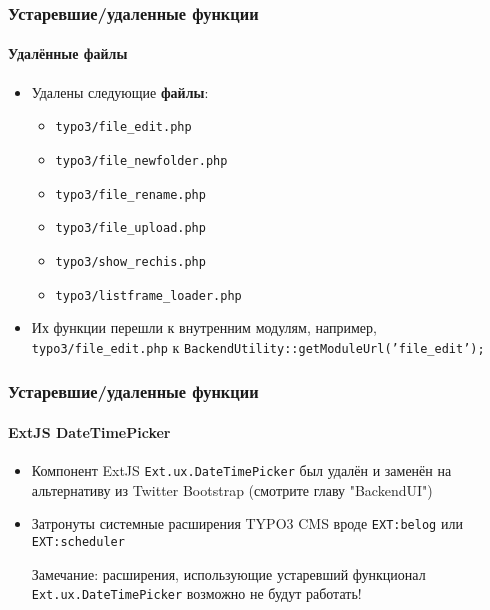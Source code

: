 \begin{frame}[fragile]
	\frametitle{Устаревшие/удаленные функции}
	\framesubtitle{Удалённые файлы}

	\begin{itemize}
		\item Удалены следующие \textbf{файлы}:

			\begin{itemize}
				\item \texttt{typo3/file\_edit.php}
				\item \texttt{typo3/file\_newfolder.php}
				\item \texttt{typo3/file\_rename.php}
				\item \texttt{typo3/file\_upload.php}
				\item \texttt{typo3/show\_rechis.php}
				\item \texttt{typo3/listframe\_loader.php}
			\end{itemize}

		\item Их функции перешли к внутренним модулям, например,
			\texttt{typo3/file\_edit.php} к \texttt{BackendUtility::getModuleUrl('file\_edit');}

	\end{itemize}

\end{frame}


\begin{frame}[fragile]
	\frametitle{Устаревшие/удаленные функции}
	\framesubtitle{ExtJS DateTimePicker}

	\begin{itemize}

		\item Компонент ExtJS \texttt{Ext.ux.DateTimePicker} был удалён и заменён на
			альтернативу из Twitter Bootstrap (смотрите главу "BackendUI")

		\item Затронуты системные расширения TYPO3 CMS вроде \texttt{EXT:belog} или
			\texttt{EXT:scheduler}

			\vspace{0.2cm}

			\begingroup
				\color{red}
					Замечание: расширения, использующие устаревший функционал
					\texttt{Ext.ux.DateTimePicker} возможно не будут работать!
			\endgroup

	\end{itemize}

\end{frame}

